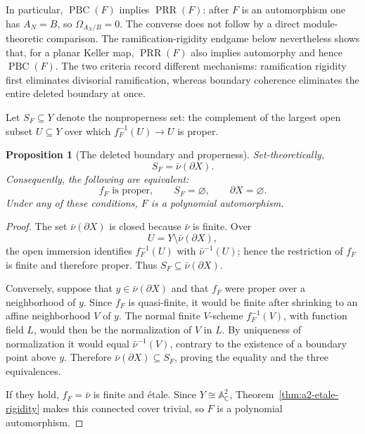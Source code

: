 \documentclass[11pt]{article}
\newtheorem{proposition}[theorem]{Proposition}
\theoremstyle{remark}
\theoremstyle{definition}
\newcommand{\A}{\mathbb A}
\newcommand{\C}{\mathbb C}
\begin{document}
In particular, \(\operatorname{PBC}(F)\) implies
\(\operatorname{PRR}(F)\): after \(F\) is an automorphism one has
\(A_N=B\), so \(\Omega_{A_N/B}=0\).  The converse does not follow by a
direct module-theoretic comparison.  The ramification-rigidity endgame below
nevertheless shows that, for a planar Keller map, \(\operatorname{PRR}(F)\)
also implies automorphy and hence \(\operatorname{PBC}(F)\).  The two
criteria record different mechanisms: ramification rigidity first eliminates
divisorial ramification, whereas boundary coherence eliminates the entire
deleted boundary at once.

Let \(S_F\subseteq Y\) denote the nonproperness set: the complement of
the largest open subset \(U\subseteq Y\) over which
\(f_F^{-1}(U)\to U\) is proper.

\begin{proposition}[The deleted boundary and properness]
\label{prop:planar-boundary-properness}
Set-theoretically,
\[
  S_F=\bar\nu(\partial X).
\]
Consequently, the following are equivalent:
\[
  f_F\text{ is proper},
  \qquad
  S_F=\varnothing,
  \qquad
  \partial X=\varnothing.
\]
Under any of these conditions, \(F\) is a polynomial automorphism.
\end{proposition}

\begin{proof}
The set \(\bar\nu(\partial X)\) is closed because \(\bar\nu\) is finite.
Over
\[
  U=Y\setminus\bar\nu(\partial X),
\]
the open immersion identifies \(f_F^{-1}(U)\) with
\(\bar\nu^{-1}(U)\); hence the restriction of \(f_F\) is finite and
therefore proper.  Thus \(S_F\subseteq\bar\nu(\partial X)\).

Conversely, suppose that \(y\in\bar\nu(\partial X)\) and that \(f_F\)
were proper over a neighborhood of \(y\).  Since \(f_F\) is quasi-finite,
it would be finite after shrinking to an affine neighborhood \(V\) of
\(y\).  The normal finite \(V\)-scheme \(f_F^{-1}(V)\), with function
field \(L\), would then be the normalization of \(V\) in \(L\).  By
uniqueness of normalization it would equal \(\bar\nu^{-1}(V)\), contrary
to the existence of a boundary point above \(y\).  Therefore
\(\bar\nu(\partial X)\subseteq S_F\), proving the equality and the three
equivalences.

If they hold, \(f_F=\bar\nu\) is finite and \'etale.  Since
\(Y\cong\A^2_{\C}\), Theorem~\ref{thm:a2-etale-rigidity} makes this
connected cover trivial, so \(F\) is a polynomial automorphism.
\end{proof}
\end{document}
